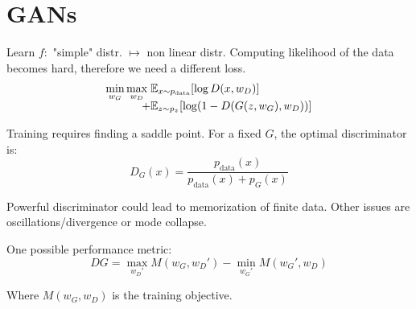 \section*{GANs}

Learn $f:$ "simple" distr. $\mapsto$ non linear distr. Computing likelihood of the data becomes hard, therefore we need a different loss.
\begin{align*}
	\min_{w_G} \max_{w_D} \; & \mathbb{E}_{x \sim p_{\text{data}}} [\log D(x, w_D)] \\[-5pt]
 	+ &\mathbb{E}_{z \sim p_z} [\log (1 - D(G(z, w_G), w_D))]
\end{align*}
 
 Training requires finding a saddle point. For a fixed $G$, the optimal discriminator is:
 $$D_G(x) = \frac{p_{\text{data}}(x)}{p_{\text{data}}(x) + p_G(x)}$$
 
Powerful discriminator could lead to memorization of finite data. Other issues are oscillations/divergence or mode collapse. \smallskip
 
One possible performance metric:
$$DG = \max_{w_D'} M(w_G, w_D') - \min_{w_G'} M(w_G', w_D)$$
 
Where $M(w_G, w_D)$ is the training objective.
